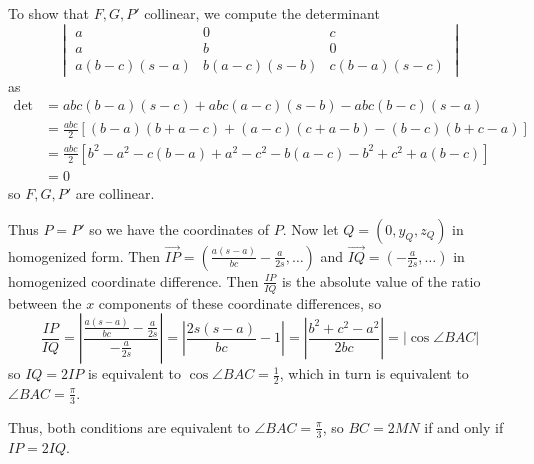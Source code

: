To show that $F,G,P'$ collinear, we compute the determinant \[
\begin{vmatrix}
	a & 0 & c \\
	a & b & 0 \\
	a\left(b-c\right)\left(s-a\right) & b\left(a-c\right)\left(s-b\right) & c\left(b-a\right)\left(s-c\right)
\end{vmatrix}
\] as
\begin{align*}
	\text{det}&=abc\left(b-a\right)\left(s-c\right)+abc\left(a-c\right)\left(s-b\right)-abc\left(b-c\right)\left(s-a\right)\\
	&=\frac{abc}{2}\left[\left(b-a\right)\left(b+a-c\right)+\left(a-c\right)\left(c+a-b\right)-\left(b-c\right)\left(b+c-a\right)\right]\\
	&=\frac{abc}{2}\left[b^2-a^2-c\left(b-a\right)+a^2-c^2-b\left(a-c\right)-b^2+c^2+a\left(b-c\right)\right]\\
	&=0
\end{align*}
so $F,G,P'$ are collinear.

Thus $P=P'$ so we have the coordinates of $P$. Now let $Q=\left(0,y_Q,z_Q\right)$ in homogenized form. Then $\overrightarrow{IP}=\left(\frac{a\left(s-a\right)}{bc}-\frac{a}{2s},\ldots\right)$ and $\overrightarrow{IQ}=\left(-\frac{a}{2s},\ldots\right)$ in homogenized coordinate difference. Then $\frac{IP}{IQ}$ is the absolute value of the ratio between the $x$ components of these coordinate differences, so \[\frac{IP}{IQ}=\left|\frac{\frac{a\left(s-a\right)}{bc}-\frac{a}{2s}}{-\frac{a}{2s}}\right|=\left|\frac{2s\left(s-a\right)}{bc}-1\right|=\left|\frac{b^2+c^2-a^2}{2bc}\right|=\left|\cos\angle{BAC}\right|\] so $IQ=2IP$ is equivalent to $\cos\angle{BAC}=\frac{1}{2}$, which in turn is equivalent to $\angle{BAC}=\frac{\pi}{3}$.

Thus, both conditions are equivalent to $\angle{BAC}=\frac{\pi}{3}$, so $BC=2MN$ if and only if $IP=2IQ$.